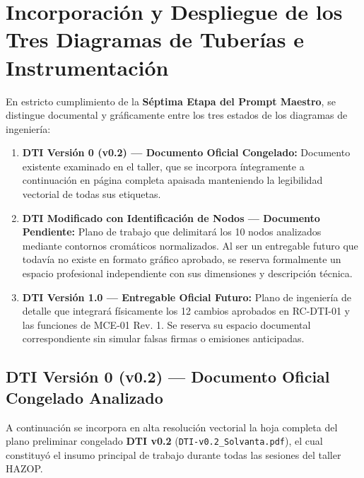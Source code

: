 \documentclass[10pt,letterpaper]{article}
\begin{document}
\section{Incorporación y Despliegue de los Tres Diagramas de Tuberías e Instrumentación}
En estricto cumplimiento de la \textbf{Séptima Etapa del Prompt Maestro}, se distingue documental y gráficamente entre los tres estados de los diagramas de ingeniería:
\begin{enumerate}[leftmargin=*]
    \item \textbf{DTI Versión 0 (v0.2) --- Documento Oficial Congelado:} Documento existente examinado en el taller, que se incorpora íntegramente a continuación en página completa apaisada manteniendo la legibilidad vectorial de todas sus etiquetas.
    \item \textbf{DTI Modificado con Identificación de Nodos --- Documento Pendiente:} Plano de trabajo que delimitará los 10 nodos analizados mediante contornos cromáticos normalizados. Al ser un entregable futuro que todavía no existe en formato gráfico aprobado, se reserva formalmente un espacio profesional independiente con sus dimensiones y descripción técnica.
    \item \textbf{DTI Versión 1.0 --- Entregable Oficial Futuro:} Plano de ingeniería de detalle que integrará físicamente los 12 cambios aprobados en RC-DTI-01 y las funciones de MCE-01 Rev. 1. Se reserva su espacio documental correspondiente sin simular falsas firmas o emisiones anticipadas.
\end{enumerate}

\subsection{DTI Versión 0 (v0.2) --- Documento Oficial Congelado Analizado}
A continuación se incorpora en alta resolución vectorial la hoja completa del plano preliminar congelado \textbf{DTI v0.2} (\texttt{DTI-v0.2\_Solvanta.pdf}), el cual constituyó el insumo principal de trabajo durante todas las sesiones del taller HAZOP.


\end{document}
